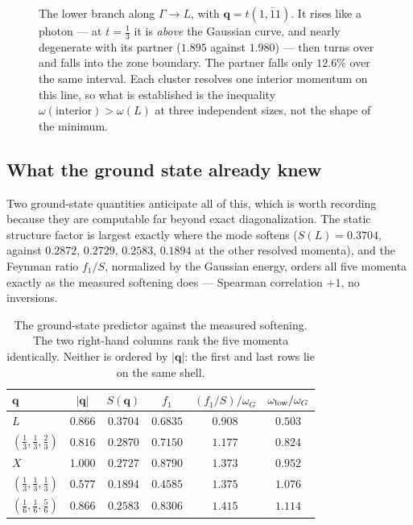 \documentclass[11pt]{article}
\newcommand{\bq}{\bm q}
\begin{document}
\begin{figure}[h]
\caption{The lower branch along $\Gamma\to L$, with $\bq=t(1,\bar11)$.
It rises like a photon --- at $t=\tfrac13$ it is \emph{above} the
Gaussian curve, and nearly degenerate with its partner ($1.895$ against
$1.980$) --- then turns over and falls into the zone boundary. The
partner falls only $12.6\%$ over the same interval. Each cluster
resolves one interior momentum on this line, so what is established is
the inequality $\omega(\text{interior})>\omega(L)$ at three independent
sizes, not the shape of the minimum.}
\label{fig:disp}
\end{figure}

\subsection{What the ground state already knew}

Two ground-state quantities anticipate all of this, which is worth
recording because they are computable far beyond exact diagonalization.
The static structure factor is largest exactly where the mode softens
($S(L)=0.3704$, against $0.2872$, $0.2729$, $0.2583$, $0.1894$ at the
other resolved momenta), and the Feynman ratio $f_1/S$, normalized by
the Gaussian energy, orders all five momenta exactly as the measured
softening does --- Spearman correlation $+1$, no inversions.

\begin{table}[h]
\centering
\caption{The ground-state predictor against the measured softening. The
two right-hand columns rank the five momenta identically. Neither is
ordered by $|\bq|$: the first and last rows lie on the same shell.}
\label{tab:predict}
\begin{tabular}{lccccc}
\toprule
$\bq$ & $|\bq|$ & $S(\bq)$ & $f_1$ & $(f_1/S)/\omega_G$ &
$\omega_{\rm low}/\omega_G$\\
\midrule
$L$ & $0.866$ & $0.3704$ & $0.6835$ & $\bm{0.908}$ & $\bm{0.503}$\\
$(\frac13,\frac13,\frac23)$ & $0.816$ & $0.2870$ & $0.7150$ & $1.177$
 & $0.824$\\
$X$ & $1.000$ & $0.2727$ & $0.8790$ & $1.373$ & $0.952$\\
$(\frac13,\frac13,\frac13)$ & $0.577$ & $0.1894$ & $0.4585$ & $1.375$
 & $1.076$\\
$(\frac16,\frac16,\frac56)$ & $0.866$ & $0.2583$ & $0.8306$ & $1.415$
 & $1.114$\\
\bottomrule
\end{tabular}
\end{table}
\end{document}
